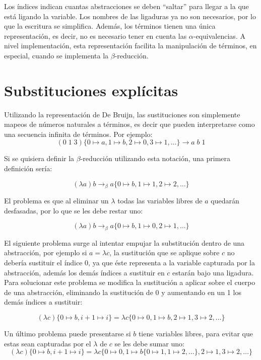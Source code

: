 Los índices indican cuantas abstracciones se deben ``saltar'' para llegar a la que está ligando la variable.
Los nombres de las ligaduras ya no son necesarios, por lo que la escritura se simplifica.
Además, los términos tienen una única representación, es decir, no es necesario tener en cuenta las $\alpha$-equivalencias.
A nivel implementación, esta representación facilita la manipulación de términos, en especial, cuando se implementa la $\beta$-reducción.

\section{Substituciones explícitas}
Utilizando la representación de De Bruijn, las sustituciones son simplemente mapeos de números naturales a términos, es decir que pueden interpretarse como una secuencia infinita de términos.
Por ejemplo:
\[ (0\; 1\; 3)\{0\mapsto a, 1\mapsto b, 2\mapsto 0, 3\mapsto 1, \dots \} \rightarrow a\; b\; 1 \]

Si se quisiera definir la $\beta$-reducción utilizando esta notación, una primera definición sería:

\[ (\lambda a)b \rightarrow_{\beta} a \{ 0 \mapsto b, 1\mapsto 1, 2\mapsto 2, \dots \} \]

El problema es que al eliminar un $\lambda$ todas las variables libres de $a$ quedarán desfasadas, por lo que se les debe restar uno:

\[ (\lambda a)b \rightarrow_{\beta} a \{ 0 \mapsto b, 1\mapsto 0, 2\mapsto 1, \dots \} \]


El siguiente problema surge al intentar empujar la substitución dentro de una abstracción, por ejemplo si $a = \lambda c$, la sustitución que se aplique sobre $c$ no debería sustituir el índice 0, ya que  éste representa a la variable capturada por la abstracción, además los demás índices a sustituir en $c$ estarán bajo una ligadura.
Para solucionar este problema se modifica la sustitución a aplicar sobre el cuerpo de una abstracción, eliminando la sustitución de 0 y aumentando en un 1 los demás índices a sustituir:

\[ (\lambda c)\{ 0 \mapsto b, i+1\mapsto i \} = \lambda c \{ 0 \mapsto 0, 1 \mapsto b, 2\mapsto 1, 3\mapsto 2, \dots \} \]

Un último problema puede presentarse si $b$ tiene variables libres, para evitar que estas sean capturadas por el $\lambda$ de $c$ se les debe sumar uno:
\[ (\lambda c)\{ 0 \mapsto b, i+1\mapsto i \} = \lambda c \{ 0 \mapsto 0, 1 \mapsto b \{ 0\mapsto 1, 1\mapsto 2, \dots \}, 2\mapsto 1, 3\mapsto 2, \dots \} \]

